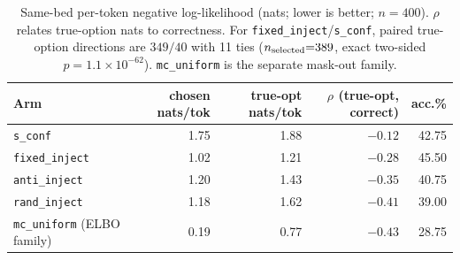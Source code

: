 \documentclass{article}
\newcommand{\sconf}{\texttt{s\_conf}}
\newcommand{\rinj}{\texttt{rand\_inject}}
\newcommand{\ainj}{\texttt{anti\_inject}}
\newcommand{\finj}{\texttt{fixed\_inject}}
\newcommand{\mcu}{\texttt{mc\_uniform}}
\begin{document}
\begin{table}[t]
\centering
\footnotesize
\setlength{\tabcolsep}{4pt}
\caption{Same-bed per-token negative log-likelihood (nats; lower is better;
$n{=}400$).  $\rho$ relates true-option nats to correctness.
For \finj{}/\sconf{}, paired true-option directions are $349/40$ with 11 ties
($n_{\rm selected}{=}389$, exact two-sided $p=1.1\!\times\!10^{-62}$).
\mcu{} is the separate mask-out family.}
\label{tab:samebed-likelihood}
\begin{tabular}{@{}lrrrr@{}}
\toprule
Arm & chosen nats/tok & true-opt nats/tok & $\rho$ (true-opt, correct) & acc.\% \\
\midrule
\sconf{} & 1.75 & 1.88 & $-0.12$ & 42.75 \\
\finj{}  & 1.02 & 1.21 & $-0.28$ & 45.50 \\
\ainj{}  & 1.20 & 1.43 & $-0.35$ & 40.75 \\
\rinj{}  & 1.18 & 1.62 & $-0.41$ & 39.00 \\
\mcu{} (ELBO family) & 0.19 & 0.77 & $-0.43$ & 28.75 \\
\bottomrule
\end{tabular}
\end{table}
\end{document}
